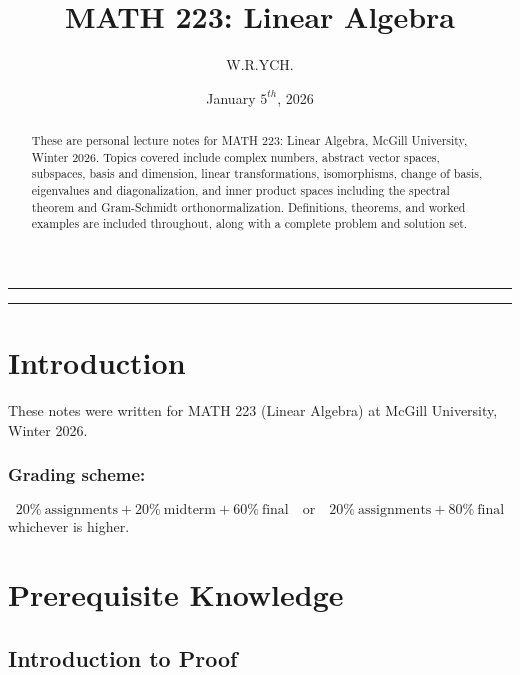 \documentclass{article}
\begin{document}
\title{MATH 223: Linear Algebra}
\author{W.R.YCH.}
\date{January \(5^{th}\), 2026}
\setcounter{Maxaffil}{0}
\renewcommand\Affilfont{\itshape\small}
\maketitle

\noindent\rule{\textwidth}{0.4pt}
\thispagestyle{empty}
\begin{abstract}
    These are personal lecture notes for MATH 223: Linear Algebra, McGill University, Winter 2026. Topics covered include complex numbers, abstract vector spaces, subspaces, basis and dimension, linear transformations, isomorphisms, change of basis, eigenvalues and diagonalization, and inner product spaces including the spectral theorem and Gram-Schmidt orthonormalization. Definitions, theorems, and worked examples are included throughout, along with a complete problem and solution set.
\end{abstract}
\noindent\rule{\textwidth}{0.4pt}
\clearpage

\thispagestyle{empty}
{
  \hypersetup{linkcolor=black}
  \tableofcontents
}
\clearpage

\setcounter{page}{1}
\section{Introduction}
These notes were written for MATH 223 (Linear Algebra) at McGill University, Winter 2026.
\subsubsection*{Grading scheme:}
\vspace{-2em}
\[20\%\ \text{assignments} + 20\%\ \text{midterm} + 60\%\ \text{final} \quad \text{or} \quad 20\%\ \text{assignments} + 80\%\ \text{final}\]
whichever is higher.

\section{Prerequisite Knowledge}

\subsection{Introduction to Proof}
\end{document}
